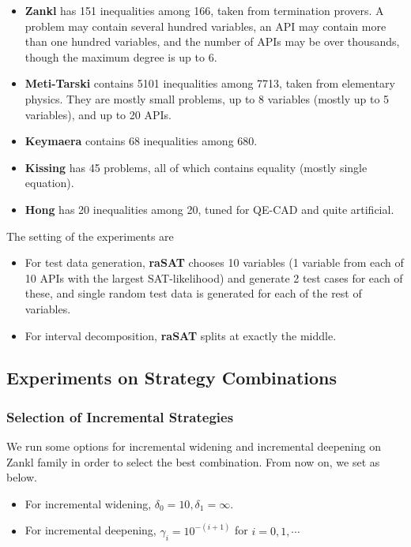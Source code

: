\documentclass[runningheads,a4paper,oribibl]{llncs}
\begin{document}
\begin{itemize}
\item {\bf Zankl} has 151 inequalities among 166, taken from termination provers. 
A problem may contain several hundred variables, an API may contain more than one hundred variables, 
and the number of APIs may be over thousands, though the maximum degree is up to $6$. 
\item {\bf Meti-Tarski} contains 5101 inequalities among 7713, taken from elementary physics.
They are mostly small problems, up to 8 variables (mostly up to 5 variables), and up to 20 APIs. 
\item {\bf Keymaera} contains 68 inequalities among 680. 
\item {\bf Kissing} has 45 problems, all of which contains equality (mostly single equation). 
\item {\bf Hong} has 20 inequalities among 20, tuned for QE-CAD and quite artificial. 
\end{itemize}

The setting of the experiments are
\begin{itemize}
\item For test data generation, {\bf raSAT} chooses 10 variables (1 variable from each of 10 APIs
  with the largest SAT-likelihood) and generate 2 test cases for each of these, and single random test data is
  generated for each of the rest of variables.
\item For interval decomposition, {\bf raSAT} splits at exactly the middle. 
\end{itemize}


\subsection{Experiments on Strategy Combinations} \label{sec:expstrategy}

\subsubsection*{Selection of Incremental Strategies}
We run some options for incremental widening and incremental deepening on Zankl family
in order to select the best combination. From now on, we set as below. 
\begin{itemize}
\item For incremental widening, $\delta_0 = 10, \delta_1 = \infty$.
\item For incremental deepening, $\gamma_i = 10^{-(i+1)}$ for $i = 0, 1, \cdots$
\end{itemize}
\end{document}
